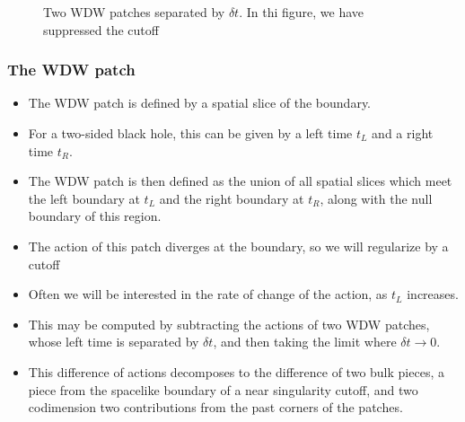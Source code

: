 \documentclass[8pt,aspectratio=169]{beamer}
\begin{document}
\begin{frame}
\begin{minipage}[t]{0.48\linewidth}
\begin{figure}
\begin{center}
    \end{center}
    \caption{Two WDW patches separated by $\delta t$.  In thi figure, we have suppressed the cutoff}
    \label{fig:2WDW}
\end{figure}

\end{minipage}

\end{frame}


\begin{frame}
\frametitle{The WDW patch}

\begin{minipage}[t]{0.5\linewidth}

\begin{itemize}

\item The WDW patch is defined by a spatial slice of the boundary. 

\item For a two-sided black hole, this can be given by a left time $t_L$ and a right time $t_R$.

\item The WDW patch is then defined as the union of all spatial slices which meet the left boundary at $t_L$ and the right boundary at $t_R$, along with the null boundary of this region.

\item The action of this patch diverges at the boundary, so we will regularize by a cutoff

\item Often we will be interested in the rate of change of the action, as $t_L$ increases.

\item This may be computed by subtracting the actions of two WDW patches, whose left time is separated by $\delta t$, and then taking the limit where $\delta t \rightarrow 0$.

\item This difference of actions decomposes to the difference of two bulk pieces, a piece from the spacelike boundary of a near singularity cutoff, and two codimension two contributions from the past corners of the patches.

\end{itemize}

\end{minipage}\hfill
%
\begin{minipage}[t]{0.48\linewidth}

\begin{figure}
    \begin{center}
    

\end{center}
\end{figure}
\end{minipage}
\end{frame}
\end{document}
